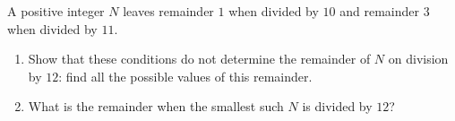 A positive integer $N$ leaves remainder $1$ when divided by $10$ and remainder $3$ when divided by $11$.
\begin{enumerate}
\item[(a)] Show that these conditions do not determine the remainder of $N$ on division by $12$: find all the possible values of this remainder.
\item[(b)] What is the remainder when the smallest such $N$ is divided by $12$?
\end{enumerate}
